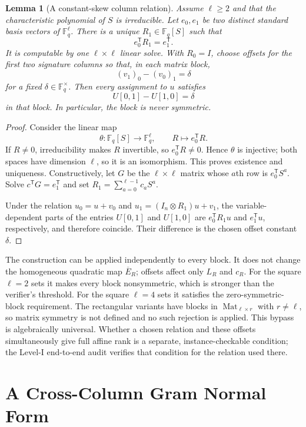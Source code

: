 \documentclass[11pt]{article}
\newtheorem{lemma}[theorem]{Lemma}
\newcommand{\F}{\mathbb F}
\newcommand{\Mat}{\operatorname{Mat}}
\newcommand{\transpose}{\mathsf T}
\begin{document}
\begin{lemma}[A constant-skew column relation]\label{lem:skew}
Assume $\ell\ge2$ and that the characteristic polynomial of $S$ is
irreducible.  Let $e_0,e_1$ be two distinct standard basis vectors of
$\F_q^\ell$.  There is a unique $R_1\in\F_q[S]$ such that
\[
 e_0^\transpose R_1=e_1^\transpose.
\]
It is computable by one $\ell\times\ell$ linear solve.  With $R_0=I$, choose
offsets for the first two signature columns so that, in each matrix block,
\[
 (v_1)_0-(v_0)_1=\delta
\]
for a fixed $\delta\in\F_q^\times$.  Then every assignment to $u$ satisfies
\[
 U[0,1]-U[1,0]=\delta
\]
in that block.  In particular, the block is never symmetric.
\end{lemma}

\begin{proof}
Consider the linear map
\[
 \theta:\F_q[S]\longrightarrow\F_q^\ell,
 \qquad R\longmapsto e_0^\transpose R.
\]
If $R\ne0$, irreducibility makes $R$ invertible, so
$e_0^\transpose R\ne0$.  Hence $\theta$ is injective; both spaces have
dimension $\ell$, so it is an isomorphism.  This proves existence and
uniqueness.  Constructively, let $G$ be the $\ell\times\ell$ matrix whose
$a$th row is $e_0^\transpose S^a$.  Solve $c^\transpose G=e_1^\transpose$ and
set $R_1=\sum_{a=0}^{\ell-1}c_aS^a$.

Under the relation $u_0=u+v_0$ and
$u_1=(I_n\otimes R_1)u+v_1$, the variable-dependent parts of the entries
$U[0,1]$ and $U[1,0]$ are $e_0^\transpose R_1u$ and
$e_1^\transpose u$, respectively, and therefore coincide.  Their difference
is the chosen offset constant $\delta$.
\end{proof}

The construction can be applied independently to every block.  It does not change the homogeneous quadratic map $\overline E_R$; offsets affect only $L_R$ and $c_R$.  For the square $\ell=2$ sets it makes every block nonsymmetric, which is stronger than the verifier's threshold.  For the square $\ell=4$ sets it satisfies the zero-symmetric-block requirement.  The rectangular variants have blocks in $\Mat_{\ell\times r}$ with $r\ne\ell$, so matrix symmetry is not defined and no such rejection is applied.  This bypass is algebraically universal.  Whether a chosen relation and these offsets simultaneously give full affine rank is a separate, instance-checkable condition; the Level-I end-to-end audit verifies that condition for the relation used there.

\section{A Cross-Column Gram Normal Form}\label{sec:crossnormal}
\end{document}
